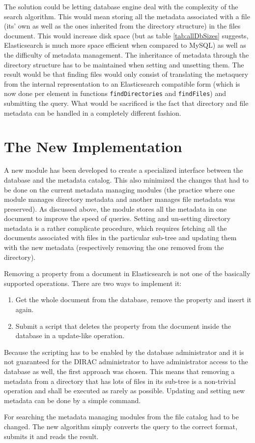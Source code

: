 The solution could be letting database engine deal 
with the complexity of the search algorithm. This would mean storing all the metadata associated with a file (its' 
own as well as the ones inherited from the directory structure) in the files document. This would increase
disk space (but as table \ref{tab:allDbSizes} suggests, Elasticsearch is much more space efficient when compared 
to MySQL) as well as the difficulty of metadata management. The inheritance of metadata through the directory 
structure has to be maintained when setting and unsetting them. The result would be that finding files would 
only consist of translating the metaquery from the internal representation to an Elasticsearch compatible form 
(which is now done per element in functions \texttt{findDirectories} and \texttt{findFiles}) and submitting the
query. What would be sacrificed is the fact that directory and file metadata can be handled in a completely 
different fashion.

\section{The New Implementation}

A new module has been developed to create a specialized interface between the database and the metadata catalog. This 
also minimized the changes that had to be done on the current metadata managing modules (the practice where one
module manages directory metadata and another manages file metadata was preserved). As discussed above, the 
module stores all the metadata in one document to improve the speed of queries. Setting and un-setting directory 
metadata is a rather complicate procedure, which requires fetching all the documents associated with files in
the particular sub-tree and updating them with the new metadata (respectively removing the one removed from the 
directory). 

Removing a property from a document in Elasticsearch is not one of the basically supported operations. There are 
two ways to implement it: 
\begin{enumerate}
\item Get the whole document from the database, remove the property and insert it again.
\item Submit a script that deletes the property from the document inside the database in a update-like operation.
\end{enumerate}
Because the scripting has to be enabled by the database administrator and it is not guaranteed for the DIRAC 
administrator to have administrator access to the database as well, the first approach was chosen. This means that
removing a metadata from a directory that has lots of files in its sub-tree is a non-trivial operation and shall
be executed as rarely as possible. Updating and setting new metadata can be done by a simple command.

For searching the metadata managing modules from the file catalog had to be changed. The new algorithm simply 
converts the query to the correct format, submits it and reads the result.